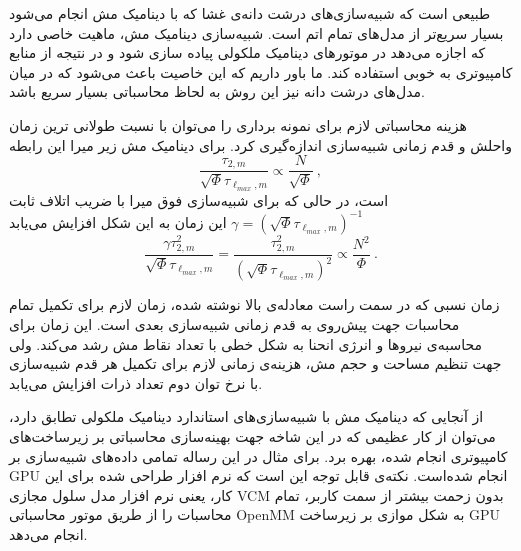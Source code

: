 طبیعی‌ است که شبیه‌سازی‌های درشت دانه‌ی غشا که با دینامیک مش انجام می‌شود بسیار سریع‌تر از مدل‌های تمام اتم است. شبیه‌سازی دینامیک مش، ماهیت خاصی دارد که اجازه‌ می‌دهد در موتور‌های دینامیک ملکولی پیاده سازی شود و در نتیجه از منابع کامپیوتری به خوبی استفاده کند. ما باور داریم که این خاصیت باعث می‌شود که در میان مدل‌های درشت دانه نیز این روش به لحاظ محاسباتی بسیار سریع باشد.

هزینه محاسباتی لازم برای نمونه برداری را می‌توان با نسبت طولانی ترین زمان واحلش و قدم زمانی شبیه‌سازی اندازه‌گیری کرد. برای دینامیک مش زیر میرا این رابطه
\begin{equation}
\frac{\tau_{2,m}}{\sqrt{\Phi} \tau_{\ell_{max},m}} \propto \frac{N}{\sqrt{\Phi}}\ ,
\end{equation}
است، در حالی که برای شبیه‌سازی فوق میرا با ضریب اتلاف ثابت
$\gamma= \left(\sqrt{\Phi} \tau_{\ell_{max},m}\right)^{-1}$
این زمان به این شکل افزایش می‌یابد
\begin{equation}
\frac{\gamma \tau_{2,m}^2}{\sqrt{\Phi} \tau_{\ell_{max},m}} = \frac{\tau_{2,m}^2}{\left(\sqrt{\Phi} \tau_{\ell_{max},m}\right)^2} \propto \frac{N^2}{\Phi}\ .
\end{equation}

زمان نسبی که در سمت راست معادله‌ی بالا نوشته شده، زمان لازم برای تکمیل تمام محاسبات جهت پیش‌روی به قدم زمانی شبیه‌سازی بعدی است. این زمان برای محاسبه‌ی نیروها و انرژی انحنا به شکل خطی با تعداد نقاط مش رشد می‌کند. ولی جهت تنظیم مساحت و حجم مش، هزینه‌ی زمانی لازم برای تکمیل هر قدم شبیه‌سازی با نرخ توان دوم تعداد ذرات افزایش می‌یابد.

از آنجایی که دینامیک مش با شبیه‌سازی‌های استاندارد دینامیک ملکولی تطابق دارد، می‌توان از کار عظیمی که در این شاخه جهت بهینه‌سازی محاسباتی بر زیرساخت‌های کامپیوتری انجام شده، بهره برد. برای مثال در این رساله تمامی داده‌های شبیه‌سازی بر 
GPU
انجام شده‌است. نکته‌ی قابل توجه این است که نرم افزار طراحی شده برای این کار، یعنی نرم افزار مدل سلول مجازی
VCM
بدون زحمت بیشتر از سمت کاربر، تمام محاسبات را از طریق موتور محاسباتی
OpenMM
به شکل موازی بر زیرساخت
GPU
انجام می‌دهد.

